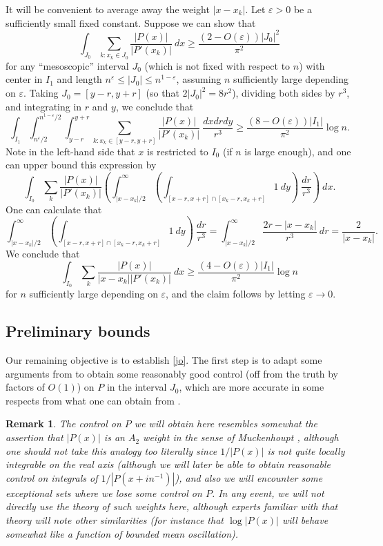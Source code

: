 \documentclass[12pt]{amsart}
\newtheorem{remark}[theorem]{Remark}
\newcommand{\eps}{\varepsilon}
\begin{document}
It will be convenient to average away the weight $|x-x_k|$.
Let $\eps > 0$ be a sufficiently small fixed constant. Suppose we can show that
\begin{equation}\label{jo} \int_{J_0} \sum_{k: x_k \in J_0} \frac{|P(x)|}{|P'(x_k)|}\ dx \geq \frac{(2 - O(\eps))|J_0|^2}{\pi^2}\end{equation}
for any ``mesoscopic'' interval $J_0$ (which is not fixed with respect to $n$) with center in $I_1$ and length $n^\eps \leq |J_0| \leq n^{1-\eps}$, assuming $n$ sufficiently large depending on $\eps$.  Taking $J_0 = [y-r, y+r]$ (so that $2|J_0|^2 = 8r^2$), dividing both sides by $r^3$, and integrating in $r$ and $y$, we conclude that
$$ \int_{I_1} \int_{n^\eps/2}^{n^{1-\eps}/2} \int_{y-r}^{y+r} \sum_{k: x_k \in [y-r, y+r]} \frac{|P(x)|}{|P'(x_k)|}\ \frac{dx dr dy}{r^3}
 \geq \frac{(8 - O(\eps)) |I_1|}{\pi^2} \log n.$$
Note in the left-hand side that $x$ is restricted to $I_0$ (if $n$ is large enough), and one can upper bound this expression by
$$ \int_{I_0} \sum_k \frac{|P(x)|}{|P'(x_k)|} \left( \int_{|x-x_k|/2}^\infty \left( \int_{[x-r,x+r] \cap [x_k-r, x_k+r]} 1\ dy \right)\ \frac{dr}{r^3} \right)\ dx.$$
One can calculate that
$$ \int_{|x-x_k|/2}^\infty \left( \int_{[x-r,x+r] \cap [x_k-r, x_k+r]} 1\ dy \right)\ \frac{dr}{r^3} =
\int_{|x-x_k|/2}^\infty \frac{2r - |x-x_k|}{r^3}\ dr =
\frac{2}{|x-x_k|}.$$
We conclude that
$$ \int_{I_0} \sum_k \frac{|P(x)|}{|x-x_k| |P'(x_k)|}\ dx
\geq \frac{(4-O(\eps))|I_1|}{\pi^2} \log n$$
for $n$ sufficiently large depending on $\eps$, and the claim follows by letting $\eps \to 0$.

\subsection{Preliminary bounds}

Our remaining objective is to establish \eqref{jo}.  The first step is to adapt some arguments from \cite{esz} to obtain some reasonably good control (off from the truth by factors of $O(1)$) on $P$ in the interval $J_0$, which are more accurate in some respects from what one can obtain from .

\begin{remark} The control on $P$ we will obtain here resembles somewhat the assertion that $|P(x)|$ is an $A_2$ weight in the sense of Muckenhoupt \cite{muckenhoupt}, although one should not take this analogy too literally since $1/|P(x)|$ is not quite locally integrable on the real axis (although we will later be able to obtain reasonable control on integrals of $1/|P(x+in^{-1})|$), and also we will encounter some exceptional sets where we lose some control on $P$.  In any event, we will not directly use the theory of such weights here, although experts familiar with that theory will note other similarities (for instance that $\log |P(x)|$ will behave somewhat like a function of bounded mean oscillation).
\end{remark}
\end{document}
